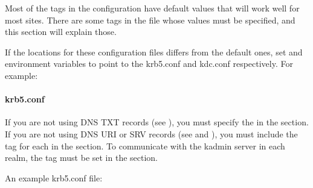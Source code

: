 \documentclass[letterpaper,10pt,english]{sphinxmanual}
\begin{document}
\sphinxAtStartPar
Most of the tags in the configuration have default values that will
work well for most sites.  There are some tags in the
{\hyperref[\detokenize{admin/conf_files/krb5_conf:krb5-conf-5}]{}} file whose values must be specified, and this
section will explain those.

\sphinxAtStartPar
If the locations for these configuration files differs from the
default ones, set  and  environment
variables to point to the krb5.conf and kdc.conf respectively.  For
example:

\begin{sphinxVerbatim}[commandchars=\\\{\}]
 
 
\end{sphinxVerbatim}


\paragraph{krb5.conf}
\label{\detokenize{admin/install_kdc:krb5-conf}}
\sphinxAtStartPar
If you are not using DNS TXT records (see {\hyperref[\detokenize{admin/realm_config:mapping-hostnames}]{}}),
you must specify the  in the {\hyperref[\detokenize{admin/conf_files/krb5_conf:libdefaults}]{}}
section.  If you are not using DNS URI or SRV records (see
{\hyperref[\detokenize{admin/realm_config:kdc-hostnames}]{}} and {\hyperref[\detokenize{admin/realm_config:kdc-discovery}]{}}), you must include the
 tag for each  in the {\hyperref[\detokenize{admin/conf_files/krb5_conf:realms}]{}} section.  To
communicate with the kadmin server in each realm, the 
tag must be set in the
{\hyperref[\detokenize{admin/conf_files/krb5_conf:realms}]{}} section.

\sphinxAtStartPar
An example krb5.conf file:
\end{document}
